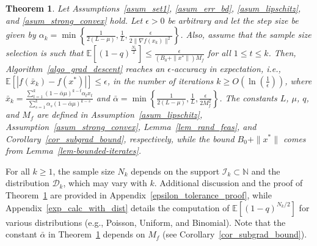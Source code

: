 \documentclass{article}
\def\a{\alpha}
\newcommand{\EXP}[1]
{\mathbb{E}\!\left[#1\right] }
\newcommand{\colr}[1]{\textcolor{red}{#1}} %
\theoremstyle{plain}
\newtheorem{theorem}{Theorem}[section]
\theoremstyle{definition}
\theoremstyle{remark}
\begin{document}
\begin{theorem}\label{thm_epsilon_tolerance}
    Let Assumptions~\ref{asum_set1}, \ref{asum_err_bd}, \ref{asum_lipschitz}, and \ref{asum_strong_convex} hold. Let $\epsilon > 0$ be arbitrary and let the step size be given by $\a_k = \min\left\{ \frac{1}{2(L-\mu)}, \frac{1}{L}, \frac{\epsilon}{2 \|\nabla f(x_k)\|^2} \right\}$. Also, assume that the sample size selection is such that $\EXP{(1-q)^{\frac{N_t}{2}}} \leq \frac{\epsilon}{(B_0 + \|x^*\|) M_f}$ for all $1 \leq t \leq k$. Then, Algorithm~\ref{algo_grad_descent} reaches an $\epsilon$-accuracy in expectation, i.e.,  $\EXP{|f(\bar x_{k}) - f(x^*)|} \leq \epsilon$, in the number of iterations $k \geq O \left( \ln \left( \frac{1}{\epsilon} \right) \right)$, where $\bar x_{k} = \frac{\sum_{t=1}^{k} (1- \bar \a \mu)^{k-t} \a_{t} x_{t}}{\sum_{s=1}^{k} \a_{s} (1- \bar \a \mu)^{k-s}}$ and $\bar \a = \min\left\{ \frac{1}{2(L-\mu)}, \frac{1}{L}, \frac{\epsilon}{2 M_f^2} \right\}$. The constants $L$, $\mu$, $q$, and $M_f$ are defined in Assumption~\ref{asum_lipschitz}, Assumption~\ref{asum_strong_convex}, Lemma~\ref{lem_rand_feas}, and Corollary~\ref{cor_subgrad_bound}, respectively, while the bound $B_0 + \|x^*\|$ comes from Lemma~\ref{lem-bounded-iterates}.
\end{theorem}
%
%
For all $k \ge 1$, the sample size $N_k$ depends on the support $\mathcal{I}_k \subset \mathbb{N}$ and the distribution $\mathcal{D}_k$, which may vary with $k$. Additional discussion and the proof of Theorem~\ref{thm_epsilon_tolerance} are provided in Appendix~\ref{epsilon_tolerance_proof}, while Appendix~\ref{exp_calc_with_dist} details the computation of $\mathbb{E}[(1-q)^{N_k/2}]$ for various distributions (e.g., Poisson, Uniform, and Binomial).
%
%
%
%
Note that the constant $\bar{\alpha}$ in Theorem~\ref{thm_epsilon_tolerance} depends on $M_f$ (see Corollary~\ref{cor_subgrad_bound}).



\end{document}
